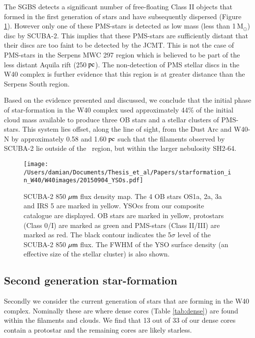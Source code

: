The SGBS detects a significant number of free-floating Class II objects that 
formed in the first generation of stars and have subsequently dispersed (Figure 
\ref{fig:w40ysos}). However only one of these PMS-stars is detected as low mass 
(less than 1\,M$_{\odot}$) disc by SCUBA-2. This implies that these PMS-stars 
are sufficiently distant that their discs are too faint to be detected by the JCMT. 
This is not the case of PMS-stars in the Serpens MWC 297 region which is 
believed to be part of the less distant Aquila rift (250$\hbox{ pc}$). The 
non-detection of PMS stellar discs in the W40 complex is further evidence 
that this region is at greater distance than the Serpens South region.

Based on the evidence presented and discussed, we conclude that the initial 
phase of star-formation in the W40 complex used approximately 44\% of the 
initial cloud mass available to produce three OB stars and a stellar clusters of 
PMS-stars. This system lies offset, along the line of sight, from the Dust Arc and 
W40-N by approximately 0.58 and 1.60$\hbox{ pc}$ such that the filaments 
observed by SCUBA-2 lie outside of the \HII\ region, but within the larger 
nebulosity SH2-64. 

\begin{figure*}
\begin{center}
\texttt{[image: /Users/damian/Documents/Thesis\_et\_al/Papers/starformation\_in\_W40/W40images/20150904\_YSOs.pdf]}
\caption{SCUBA-2 850\,$\,\mu\rm{m}$ flux density map. The 4 OB stars OS1a, 2a, 3a and IRS 5 are marked in yellow. YSOcs from our  composite catalogue are displayed. OB stars are marked in yellow, protostars (Class 0/I) are marked as green and PMS-stars (Class II/III) are marked as red. The black contour indicates the 5$\sigma$ level of the SCUBA-2 850\,$\,\mu\rm{m}$ flux. The FWHM of the YSO surface density (an effective size of the stellar cluster) is also shown.}
\label{fig:w40ysos}
\end{center}
\end{figure*}



\subsection{Second generation star-formation}

Secondly we consider the current generation of stars that are forming in the W40 
complex. Nominally these are where dense cores (Table \ref{tab:dense}) are found 
within the filaments and clouds. We find that 13 out of 33 of our dense cores contain 
a protostar and the remaining cores are likely starless. 

